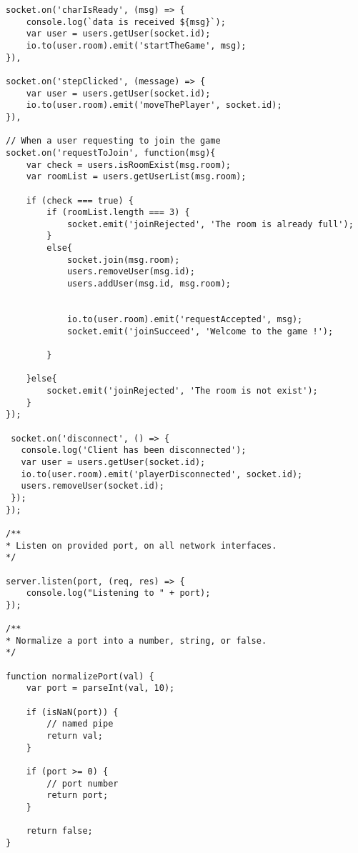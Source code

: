 \begin{lstlisting}
socket.on('charIsReady', (msg) => {
	console.log(`data is received ${msg}`);
	var user = users.getUser(socket.id);
	io.to(user.room).emit('startTheGame', msg);
}),

socket.on('stepClicked', (message) => {
	var user = users.getUser(socket.id);
	io.to(user.room).emit('moveThePlayer', socket.id);
}),

// When a user requesting to join the game
socket.on('requestToJoin', function(msg){
	var check = users.isRoomExist(msg.room);
	var roomList = users.getUserList(msg.room);

	if (check === true) {
		if (roomList.length === 3) {
			socket.emit('joinRejected', 'The room is already full');
		}
		else{
			socket.join(msg.room);
			users.removeUser(msg.id);
			users.addUser(msg.id, msg.room);


			io.to(user.room).emit('requestAccepted', msg);
			socket.emit('joinSucceed', 'Welcome to the game !');

		}

	}else{
		socket.emit('joinRejected', 'The room is not exist');
	}
});

 socket.on('disconnect', () => {
   console.log('Client has been disconnected');
   var user = users.getUser(socket.id);
   io.to(user.room).emit('playerDisconnected', socket.id);
   users.removeUser(socket.id);
 });
});

/**
* Listen on provided port, on all network interfaces.
*/

server.listen(port, (req, res) => {
	console.log("Listening to " + port);
});

/**
* Normalize a port into a number, string, or false.
*/

function normalizePort(val) {
	var port = parseInt(val, 10);

	if (isNaN(port)) {
		// named pipe
		return val;
	}

	if (port >= 0) {
		// port number
		return port;
	}

	return false;
}



\end{lstlisting}